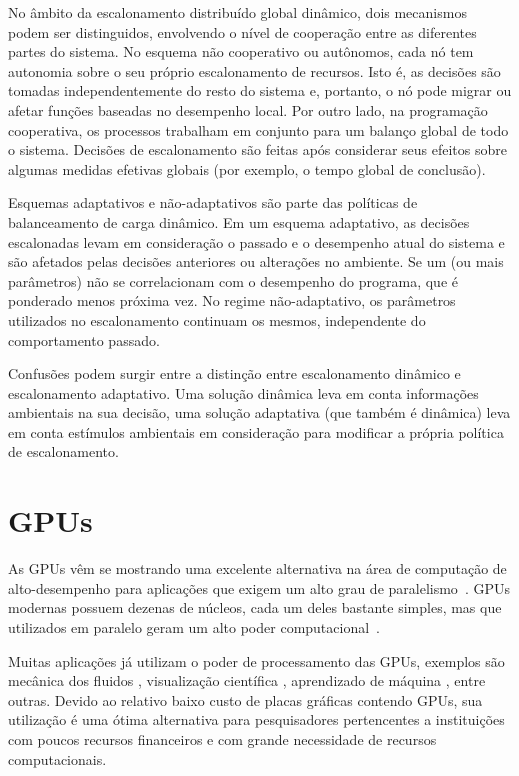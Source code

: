No âmbito da escalonamento distribuído global dinâmico, dois mecanismos podem ser distinguidos, envolvendo o nível de cooperação entre as diferentes partes do sistema. No esquema não cooperativo ou autônomos, cada nó tem autonomia sobre o seu próprio escalonamento de recursos. Isto é, as decisões são tomadas independentemente do resto do sistema e, portanto, o nó pode migrar ou afetar funções baseadas no desempenho local. Por outro lado, na programação cooperativa, os processos trabalham em conjunto para um balanço global de todo o sistema. Decisões de escalonamento são feitas após considerar seus efeitos sobre algumas medidas efetivas globais (por exemplo, o tempo global de conclusão).

Esquemas adaptativos e não-adaptativos são parte das políticas de balanceamento de carga dinâmico. Em um esquema adaptativo, as decisões escalonadas levam em consideração o passado e o desempenho atual do sistema e são afetados pelas decisões anteriores ou alterações no ambiente. Se um (ou mais parâmetros) não se correlacionam com o desempenho do programa, que é ponderado menos próxima vez. No regime não-adaptativo, os parâmetros utilizados no escalonamento continuam os mesmos, independente do comportamento passado. 
	
Confusões podem surgir entre a distinção entre escalonamento dinâmico e escalonamento adaptativo. Uma solução dinâmica leva em conta informações ambientais na sua decisão, uma solução adaptativa (que também é dinâmica) leva em conta estímulos ambientais em consideração para modificar a própria política de escalonamento.



\section{GPUs}\label{intro:historico}

As GPUs vêm se mostrando uma excelente alternativa na área de computação de alto-desempenho para aplicações que exigem um alto grau de paralelismo~\cite{gpu}. GPUs modernas possuem dezenas de núcleos, cada um deles bastante simples, mas que utilizados em paralelo geram um alto poder computacional~\cite{cuda}.

Muitas aplicações já utilizam o poder de processamento das GPUs, exemplos são mecânica dos fluidos \cite{fluido}, visualização científica \cite{visualizacao},  aprendizado de máquina \cite{Aprendizado}, entre outras. Devido ao relativo baixo custo de placas gráficas contendo GPUs, sua utilização é uma ótima alternativa para pesquisadores pertencentes a instituições com poucos recursos financeiros e com grande necessidade de recursos computacionais.


